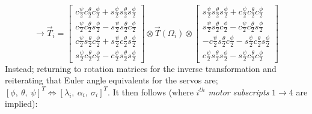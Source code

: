 \begin{subequations}
\begin{equation}
\rightarrow\vec{T}_i=
\begin{bmatrix}
c\frac{\psi}{2}c\frac{\theta}{2}c\frac{\phi}{2}+s\frac{\psi}{2}s\frac{\theta}{2}s\frac{\phi}{2}\\
c\frac{\psi}{2}c\frac{\theta}{2}s\frac{\phi}{2}-s\frac{\psi}{2}s\frac{\theta}{2}c\frac{\phi}{2}\\
c\frac{\psi}{2}s\frac{\theta}{2}c\frac{\phi}{2}+s\frac{\psi}{2}c\frac{\theta}{2}s\frac{\phi}{2}\\
s\frac{\psi}{2}c\frac{\theta}{2}c\frac{\phi}{2}-c\frac{\psi}{2}s\frac{\theta}{2}s\frac{\phi}{2}
\end{bmatrix}
\otimes
\vec{T}(\Omega_i)
\otimes
\begin{bmatrix}
s\frac{\psi}{2}s\frac{\theta}{2}s\frac{\phi}{2}+c\frac{\psi}{2}c\frac{\theta}{2}c\frac{\phi}{2}\\
s\frac{\psi}{2}s\frac{\theta}{2}c\frac{\phi}{2}-c\frac{\psi}{2}c\frac{\theta}{2}s\frac{\phi}{2}\\
-c\frac{\psi}{2}s\frac{\theta}{2}c\frac{\phi}{2}-s\frac{\psi}{2}c\frac{\theta}{2}s\frac{\phi}{2}\\
c\frac{\psi}{2}s\frac{\theta}{2}s\frac{\phi}{2}-s\frac{\psi}{2}c\frac{\theta}{2}c\frac{\phi}{2}
\end{bmatrix}
\end{equation}
\end{subequations}
Instead; returning to rotation matrices for the inverse transformation and reiterating that Euler angle equivalents for the servos are; $[\phi,~\theta,~\psi]^T\iff [\lambda_i,~\alpha_i,~\sigma_i]^T$. It then follows (where \emph{$i^{th}$ motor subscripts} $1\rightarrow 4$ are implied):
